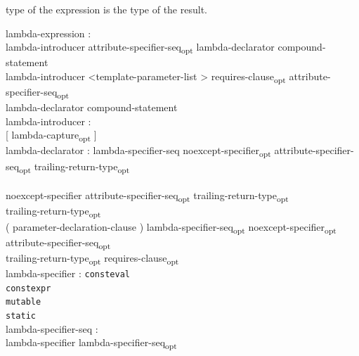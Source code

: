 \begin{modification}
  type of the expression is the type of the result.
\end{modification}

\begin{modification}
lambda-expression :\\
\tabto{1em}lambda-introducer attribute-specifier-seq\textsubscript{opt} lambda-declarator
compound-statement\\
\tabto{1em}lambda-introducer \textless template-parameter-list \textgreater
requires-clause\textsubscript{opt} attribute-specifier-seq\textsubscript{opt}\\
\tabto{1em}lambda-declarator compound-statement\\

lambda-introducer :\\
\tabto{1em}[ lambda-capture\textsubscript{opt} ]\\

lambda-declarator :
\tabto{1em}lambda-specifier-seq noexcept-specifier\textsubscript{opt}
attribute-specifier-seq\textsubscript{opt}
trailing-return-type\textsubscript{opt}\\
\tabto{2em}\\
\tabto{1em}noexcept-specifier attribute-specifier-seq\textsubscript{opt}
trailing-return-type\textsubscript{opt}
\\
\tabto{1em}trailing-return-type\textsubscript{opt}
\\
\tabto{1em}( parameter-declaration-clause ) lambda-specifier-seq\textsubscript{opt}
noexcept-specifier\textsubscript{opt}
attribute-specifier-seq\textsubscript{opt}\\
\tabto{2em}trailing-return-type\textsubscript{opt} requires-clause\textsubscript{opt}
\\

lambda-specifier :
\tabto{1em}\texttt{consteval}\\
\tabto{1em}\texttt{constexpr}\\
\tabto{1em}\texttt{mutable}\\
\tabto{1em}\texttt{static}\\

lambda-specifier-seq :\\
\tabto{1em}lambda-specifier lambda-specifier-seq\textsubscript{opt}
\end{modification}

